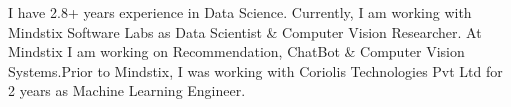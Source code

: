 
\begin{cvparagraph}
I have 2.8+ years experience in Data Science. Currently, I am working with Mindstix Software Labs as Data Scientist \& Computer Vision Researcher. At Mindstix I am working on Recommendation, ChatBot \& Computer Vision Systems.\newline Prior to Mindstix, I was working with Coriolis Technologies Pvt Ltd for 2 years as Machine Learning Engineer.
\end{cvparagraph}
